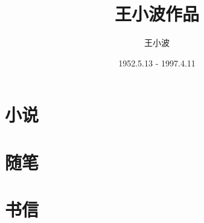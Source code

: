 \documentclass[oneside,a4paper,12pt]{book}
\begin{document}
\frontmatter
\begin{CJK*}{UTF8}{gbsn}
  \CJKindent
  \title{王小波作品}
  \author{王小波}
  \date{1952.5.13 - 1997.4.11}
  \maketitle
  \newcommand\CJKprechaptername{第}
  \newcommand\CJKchaptername{号作品}
  \renewcommand{\chaptermark}[1]{\markboth{\CJKprechaptername~\thechapter~\CJKchaptername\  #1}{}}
  \renewcommand\chaptername{\CJKprechaptername~\thechapter~\CJKchaptername}
  \renewcommand{\contentsname}{目\hspace{1em}录} 

  
  \tableofcontents
  \setcounter{secnumdepth}{1}
  \part{小说}
  \mainmatter
  
  
  
  
  
  
  
  
  
  
  
  
  
  
  
  
  
  
  
  
  
  
  
  
  
  
  
  \part{随笔}
  
  
  \part{书信}
  
  \backmatter
\end{CJK*}
\end{document}

